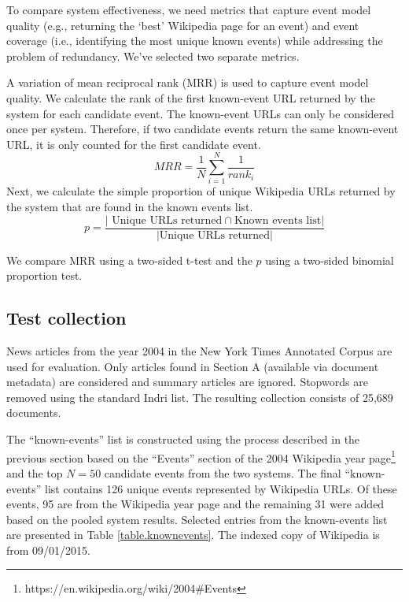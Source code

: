 \documentclass{sig-alternate}
\begin{document}
To compare system effectiveness, we need metrics that capture event model quality (e.g., returning the `best' Wikipedia page for an event) and event coverage (i.e., identifying the most unique known events) while addressing the problem of redundancy. We've selected two separate metrics.  

A variation of mean reciprocal rank (MRR) is used to capture event model quality. We calculate the rank of the first known-event URL returned by the system for each candidate event. The known-event URLs can only be considered once per system. Therefore, if two candidate events return the same known-event URL, it is only counted for the first candidate event.
\[
MRR = \dfrac{1}{N} \sum_{i=1}^{N} \dfrac{1}{rank_i}
\]
Next, we calculate the simple proportion of unique Wikipedia URLs returned by the system that are found in the known events list.
\[
p = \dfrac{\vert \text{ Unique URLs returned} \cap \text{Known events list} \vert}{\vert \text{Unique URLs returned} \vert}
\]

We compare MRR using a two-sided t-test and the $p$ using a two-sided binomial proportion test.

\subsection{Test collection}
News articles from the year 2004 in the New York Times Annotated Corpus \cite{Sandhaus2008} are used for evaluation. Only articles found in Section A (available via document metadata) are considered and summary articles are ignored. Stopwords are removed using the standard Indri list. The resulting collection consists of 25,689 documents.

The ``known-events'' list is constructed using the process described in the previous section based on the ``Events'' section of the 2004 Wikipedia year page\footnote{https://en.wikipedia.org/wiki/2004\#Events} and the top $N=50$ candidate events from the two systems.  The final ``known-events'' list contains 126 unique events represented by Wikipedia URLs. Of these events, 95 are from the Wikipedia year page and the remaining 31 were added based on the pooled system results.  Selected entries from the known-events list are presented in Table \ref{table.knownevents}.  The indexed copy of Wikipedia is from 09/01/2015.
\end{document}
